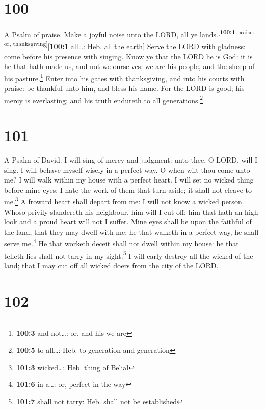 \hypertarget{section-99}{%
\section{100}\label{section-99}}

A Psalm of praise.  Make a joyful noise unto the LORD, all
ye lands.\textsuperscript{{[}\textbf{100:1} praise: or,
thanksgiving{]}}{[}\textbf{100:1} all\ldots: Heb. all the earth{]}
 Serve the LORD with gladness: come before his presence
with singing.  Know ye that the LORD he is God: it is he
that hath made us, and not we ourselves; we are his people, and the
sheep of his pasture.\footnote{\textbf{100:3} and not\ldots: or, and his
  we are}  Enter into his gates with thanksgiving, and
into his courts with praise: be thankful unto him, and bless his name.
 For the LORD is good; his mercy is everlasting; and his
truth endureth to all generations.\footnote{\textbf{100:5} to all\ldots:
  Heb. to generation and generation}

\hypertarget{section-100}{%
\section{101}\label{section-100}}

A Psalm of David.  I will sing of mercy and judgment: unto
thee, O LORD, will I sing.  I will behave myself wisely in
a perfect way. O when wilt thou come unto me? I will walk within my
house with a perfect heart.  I will set no wicked thing
before mine eyes: I hate the work of them that turn aside; it shall not
cleave to me.\footnote{\textbf{101:3} wicked\ldots: Heb. thing of Belial}
 A froward heart shall depart from me: I will not know a
wicked person.  Whoso privily slandereth his neighbour,
him will I cut off: him that hath an high look and a proud heart will
not I suffer.  Mine eyes shall be upon the faithful of the
land, that they may dwell with me: he that walketh in a perfect way, he
shall serve me.\footnote{\textbf{101:6} in a\ldots: or, perfect in the
  way}  He that worketh deceit shall not dwell within my
house: he that telleth lies shall not tarry in my sight.\footnote{\textbf{101:7}
  shall not tarry: Heb. shall not be established}  I will
early destroy all the wicked of the land; that I may cut off all wicked
doers from the city of the LORD.

\hypertarget{section-101}{%
\section{102}\label{section-101}}


